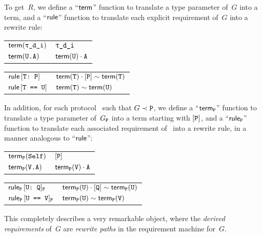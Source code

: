 \documentclass[../generics]{subfiles}
\begin{document}
To get~$R$, we define a ``$\mathsf{term}$'' function to translate a type parameter of~$G$ into a term, and a ``$\mathsf{rule}$'' function to translate each explicit requirement of~$G$ into a rewrite rule:
\begin{center}
\begin{tabular}{l@{ $:=$ }l}
\toprule
$\Term(\ttgp{d}{i})$&$\ttgp{d}{i}$\\
$\mathsf{term}(\texttt{U.A})$&$\mathsf{term}(\texttt{U})\cdot\texttt{A}$\\
\bottomrule
\end{tabular}
\qquad
\begin{tabular}{l@{ $:=$ }l}
\toprule
\index{conformance requirement!in requirement machine}$\mathsf{rule}\, [\texttt{T:~P}]$&$\mathsf{term}(\texttt{T})\cdot[\texttt{P}]\sim\mathsf{term}(\texttt{T})$\\
\index{same-type requirement!in requirement machine}$\mathsf{rule}\, [\texttt{T == U}]$&$\mathsf{term}(\texttt{T})\sim\mathsf{term}(\texttt{U})$\\
\bottomrule
\end{tabular}
\end{center}
In addition, for each protocol \tP\ such that $G\prec\texttt{P}$, we define a ``$\mathsf{term}_{\texttt{P}}$'' function to translate a type parameter of~$G_{\texttt{P}}$ into a term starting with $[\texttt{P}]$, and a ``$\mathsf{rule}_{\texttt{P}}$'' function to translate each associated requirement of \tP\ into a rewrite rule, in a manner analogous to ``$\mathsf{rule}$'':
\begin{center}
\begin{tabular}{l@{ $:=$ }l}
\toprule
$\mathsf{term}_{\texttt{P}}(\texttt{Self})$&$[\texttt{P}]$\\
$\mathsf{term}_{\texttt{P}}(\texttt{V.A})$&$\mathsf{term}_{\texttt{P}}(\texttt{V})\cdot\texttt{A}$\\
\bottomrule
\end{tabular}
\qquad
\begin{tabular}{l@{ $:=$ }l}
\toprule
\index{associated conformance requirement!in requirement machine}$\mathsf{rule}_{\texttt{P}}\, [\texttt{U:~Q}]_{\texttt{P}}$&$\mathsf{term}_{\texttt{P}}(\texttt{U})\cdot[\texttt{Q}]\sim\mathsf{term}_{\texttt{P}}(\texttt{U})$\\
\index{associated same-type requirement!in requirement machine}$\mathsf{rule}_{\texttt{P}}\, [\texttt{U == V}]_{\texttt{P}}$&$\mathsf{term}_{\texttt{P}}(\texttt{U})\sim\mathsf{term}_{\texttt{P}}(\texttt{V})$\\
\bottomrule
\end{tabular}
\end{center}
This completely describes a very remarkable object, where the \emph{derived requirements} of~$G$ are \emph{rewrite paths} in the requirement machine for~$G$.
\end{document}
